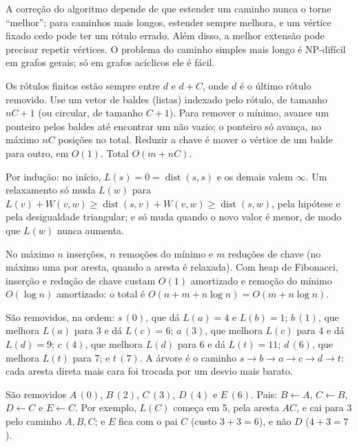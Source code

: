  A correção do algoritmo depende de que estender um caminho nunca o torne ``melhor''; para caminhos mais longos, estender sempre melhora, e um vértice fixado cedo pode ter um rótulo errado. Além disso, a melhor extensão pode precisar repetir vértices. O problema do caminho simples mais longo é NP-difícil em grafos gerais; só em grafos acíclicos ele é fácil.

 Os rótulos finitos estão sempre entre $d$ e $d+C$, onde $d$ é o último rótulo removido. Use um vetor de baldes (listas) indexado pelo rótulo, de tamanho $nC+1$ (ou circular, de tamanho $C+1$). Para remover o mínimo, avance um ponteiro pelos baldes até encontrar um não vazio; o ponteiro só avança, no máximo $nC$ posições no total. Reduzir a chave é mover o vértice de um balde para outro, em $O(1)$. Total $O(m+nC)$.

 Por indução: no início, $L(s)=0=\operatorname{dist}(s,s)$ e os demais valem $\infty$. Um relaxamento só muda $L(w)$ para $L(v)+W(v,w)\ge\operatorname{dist}(s,v)+W(v,w)\ge\operatorname{dist}(s,w)$, pela hipótese e pela desigualdade triangular; e só muda quando o novo valor é menor, de modo que $L(w)$ nunca aumenta.

 No máximo $n$ inserções, $n$ remoções do mínimo e $m$ reduções de chave (no máximo uma por aresta, quando a aresta é relaxada). Com heap de Fibonacci, inserção e redução de chave custam $O(1)$ amortizado e remoção do mínimo $O(\log n)$ amortizado: o total é $O(n+m+n\log n)=O(m+n\log n)$.

 São removidos, na ordem: $s\,(0)$, que dá $L(a)=4$ e $L(b)=1$; $b\,(1)$, que melhora $L(a)$ para 3 e dá $L(c)=6$; $a\,(3)$, que melhora $L(c)$ para 4 e dá $L(d)=9$; $c\,(4)$, que melhora $L(d)$ para 6 e dá $L(t)=11$; $d\,(6)$, que melhora $L(t)$ para 7; e $t\,(7)$. A árvore é o caminho $s\to b\to a\to c\to d\to t$: cada aresta direta mais cara foi trocada por um desvio mais barato.

 São removidos $A\,(0)$, $B\,(2)$, $C\,(3)$, $D\,(4)$ e $E\,(6)$. Pais: $B\leftarrow A$, $C\leftarrow B$, $D\leftarrow C$ e $E\leftarrow C$. Por exemplo, $L(C)$ começa em 5, pela aresta $AC$, e cai para 3 pelo caminho $A,B,C$; e $E$ fica com o pai $C$ (custo $3+3=6$), e não $D$ ($4+3=7$).
